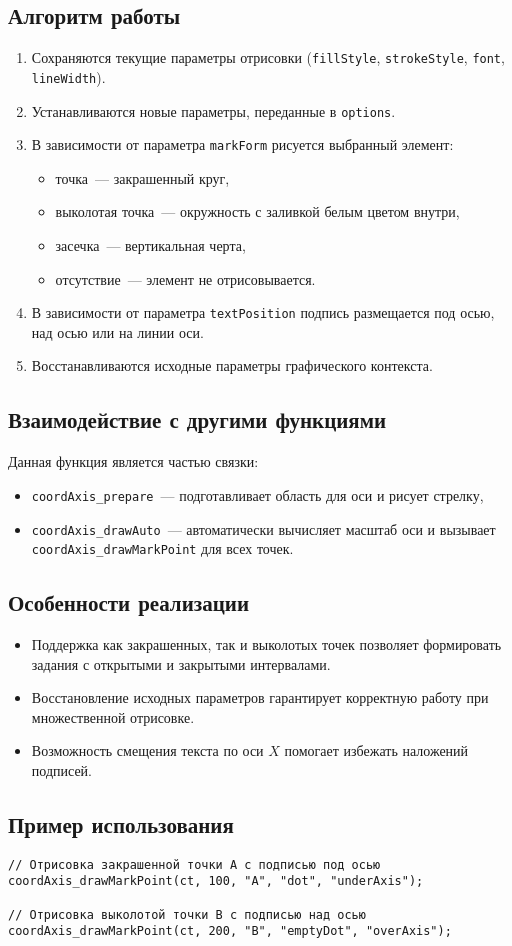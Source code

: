 \subsection{Алгоритм работы}
\begin{enumerate}
    \item Сохраняются текущие параметры отрисовки (\texttt{fillStyle}, \texttt{strokeStyle}, \texttt{font}, \texttt{lineWidth}).
    \item Устанавливаются новые параметры, переданные в \texttt{options}.
    \item В зависимости от параметра \texttt{markForm} рисуется выбранный элемент:
    \begin{itemize}
        \item точка~--- закрашенный круг,
        \item выколотая точка~--- окружность с заливкой белым цветом внутри,
        \item засечка~--- вертикальная черта,
        \item отсутствие~--- элемент не отрисовывается.
    \end{itemize}
    \item В зависимости от параметра \texttt{textPosition} подпись размещается под осью, над осью или на линии оси.
    \item Восстанавливаются исходные параметры графического контекста.
\end{enumerate}

\subsection{Взаимодействие с другими функциями}
Данная функция является частью связки:
\begin{itemize}
    \item \texttt{coordAxis\_prepare}~--- подготавливает область для оси и рисует стрелку,
    \item \texttt{coordAxis\_drawAuto}~--- автоматически вычисляет масштаб оси и вызывает \texttt{coordAxis\_drawMarkPoint} для всех точек.
\end{itemize}

\subsection{Особенности реализации}
\begin{itemize}
    \item Поддержка как закрашенных, так и выколотых точек позволяет формировать задания с открытыми и закрытыми интервалами.
    \item Восстановление исходных параметров гарантирует корректную работу при множественной отрисовке.
    \item Возможность смещения текста по оси $X$ помогает избежать наложений подписей.
\end{itemize}

\subsection{Пример использования}
\begin{verbatim}
// Отрисовка закрашенной точки A с подписью под осью
coordAxis_drawMarkPoint(ct, 100, "A", "dot", "underAxis");

// Отрисовка выколотой точки B с подписью над осью
coordAxis_drawMarkPoint(ct, 200, "B", "emptyDot", "overAxis");
\end{verbatim}